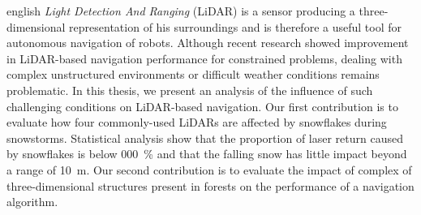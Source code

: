 \begin{otherlanguage*}{english}
\emph{Light Detection And Ranging} (LiDAR) is a sensor producing a three-dimensional representation of his surroundings and is therefore a useful tool for autonomous navigation of robots. Although recent research showed improvement in LiDAR-based navigation performance for constrained problems, dealing with complex unstructured environments or difficult weather conditions remains problematic. In this thesis, we present an analysis of the influence of such challenging conditions on LiDAR-based navigation. Our first contribution is to evaluate how four commonly-used LiDARs are affected by snowflakes during snowstorms. Statistical analysis show that the proportion of laser return caused by snowflakes is below \SI{000}{\percent} and that the falling snow has little impact beyond a range of \SI{10}{\meter}. Our second contribution is to evaluate the impact of complex of three-dimensional structures present in forests on the performance of a navigation algorithm.



\end{otherlanguage*} 
